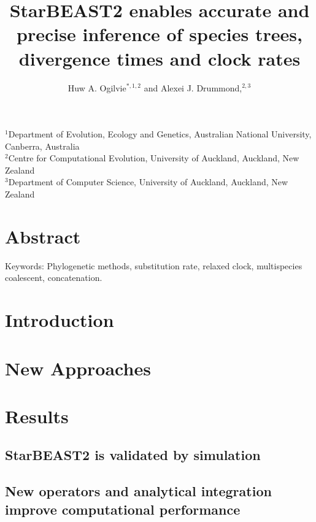\documentclass[12pt]{article}
\begin{document}
\begin{minipage}[h]{\textwidth}
	\title{StarBEAST2 enables accurate and precise inference of species trees, divergence times and clock rates}
	\author{Huw A. Ogilvie$^{\ast,1,2}$ and Alexei J. Drummond,$^{2,3}$}
    \maketitle
\end{minipage}

\raggedright
$^{1}$Department of Evolution, Ecology and Genetics, Australian National University, Canberra, Australia\\
$^{2}$Centre for Computational Evolution, University of Auckland, Auckland, New Zealand\\
$^{3}$Department of Computer Science, University of Auckland, Auckland, New Zealand

\clearpage

\section{Abstract}

Keywords: Phylogenetic methods, substitution rate, relaxed clock, multispecies coalescent, concatenation.

\section{Introduction}


\section{New Approaches}


\section{Results}

\subsection{StarBEAST2 is validated by simulation}



\subsection{New operators and analytical integration improve computational performance}
\end{document}
